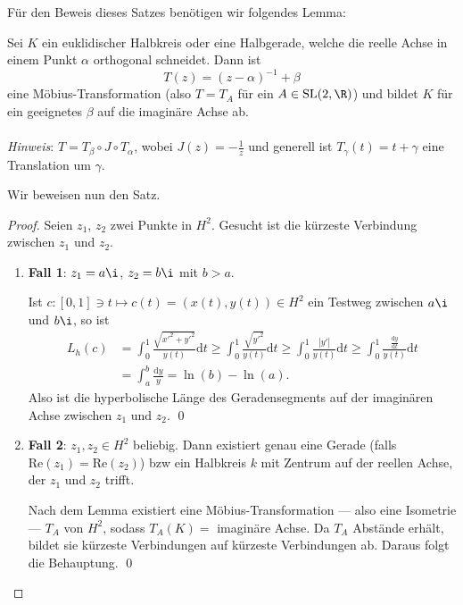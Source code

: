 Für den Beweis dieses Satzes benötigen wir folgendes Lemma:

\begin{lemma}
  Sei \( K \) ein euklidischer Halbkreis oder eine Halbgerade, welche die reelle Achse in einem Punkt \( \alpha \) orthogonal schneidet. Dann ist
  \begin{equation*}
    T(z) = {(z - \alpha)}^{-1} + \beta
  \end{equation*}
  eine Möbius-Transformation (also \( T = T_A \) für ein \( A \in \text{SL}(2,\R) \)) und bildet \( K \) für ein geeignetes \( \beta \) auf die imaginäre Achse ab. \\
  \  \\
  \emph{Hinweis}: \( T = T_\beta \circ J \circ T_\alpha \), wobei \( J(z) = -\frac{1}{z} \) und generell ist \( T_\gamma(t) = t + \gamma \) eine Translation um \( \gamma \).
\end{lemma}

Wir beweisen nun den Satz.

\begin{proof}
  Seien \( z_1 \), \( z_2 \) zwei Punkte in \( H^2 \). Gesucht ist die kürzeste Verbindung zwischen \( z_1 \) und \( z_2 \).
  \begin{enumerate}
    \item \textbf{Fall 1}: \( z_1 = a\i \), \( z_2 = b\i \) mit \( b > a \).

    Ist \( c : [0,1] \ni t \mapsto c(t) = (x(t), y(t)) \in H^2 \) ein Testweg zwischen \( a\i \) und \( b\i \), so ist
    \begin{align*}
      L_h(c) &= \int_0^1 \frac{\sqrt{x'^2 + y'^2}}{y(t)}\text{d}t \geq \int_0^1 \frac{\sqrt{y'^2}}{y(t)}\text{d}t \geq \int_0^1 \frac{\left\vert y' \right\vert}{y(t)}\text{d}t \geq \int_0^1 \frac{\frac{\text{d}y}{\text{d}t}}{y(t)}\text{d}t \\
       &= \int_a^b \frac{\text{d}y}{y} = \ln(b) - \ln(a)\text{.}
    \end{align*}
    Also ist die hyperbolische Länge des Geradensegments auf der imaginären Achse zwischen \( z_1 \) und \( z_2 \). \qed{}

    \item \textbf{Fall 2}: \( z_1, z_2 \in H^2 \) beliebig. Dann existiert genau eine Gerade (falls \( \text{Re}(z_1) = \text{Re}(z_2) \)) bzw ein Halbkreis \( k \) mit Zentrum auf der reellen Achse, der \( z_1 \) und \( z_2 \) trifft.

    Nach dem Lemma existiert eine Möbius-Transformation --- also eine Isometrie --- \( T_A \) von \( H^2 \), sodass \( T_A(K) = \) imaginäre Achse. Da \( T_A \) Abstände erhält, bildet sie kürzeste Verbindungen auf kürzeste Verbindungen ab. Daraus folgt die Behauptung. \qed{}
  \end{enumerate}
\end{proof}

